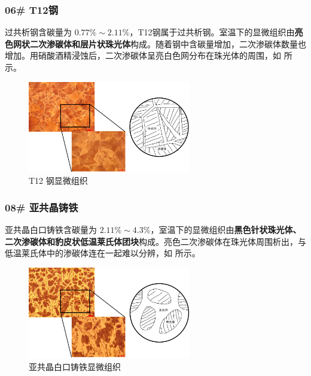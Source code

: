 \documentclass[a4paper,utf8]{article}
\begin{document}
        \subsubsection{06# T12钢}
            过共析钢含碳量为 $0.77\%\sim 2.11\%$，T12钢属于过共析钢。室温下的显微组织由\textbf{亮色网状二次渗碳体和层片状珠光体}构成。随着钢中含碳量增加，二次渗碳体数量也增加。用硝酸酒精浸蚀后，二次渗碳体呈亮白色网分布在珠光体的周围，如 所示。
            \begin{figure}[!ht]
                \includegraphics[height=40mm]{result/4.pdf}
                \caption{T12 钢显微组织\label{fig:4}}
            \end{figure}

        \subsubsection{08# 亚共晶铸铁}
            亚共晶白口铸铁含碳量为 $2.11\%\sim 4.3\%$，室温下的显微组织由\textbf{黑色针状珠光体、二次渗碳体和豹皮状低温莱氏体团块}构成。亮色二次渗碳体在珠光体周围析出，与低温莱氏体中的渗碳体连在一起难以分辨，如 所示。
            \begin{figure}[!ht]
                \includegraphics[height=40mm]{result/5.pdf}
                \caption{亚共晶白口铸铁显微组织\label{fig:5}}
            \end{figure}
\end{document}
